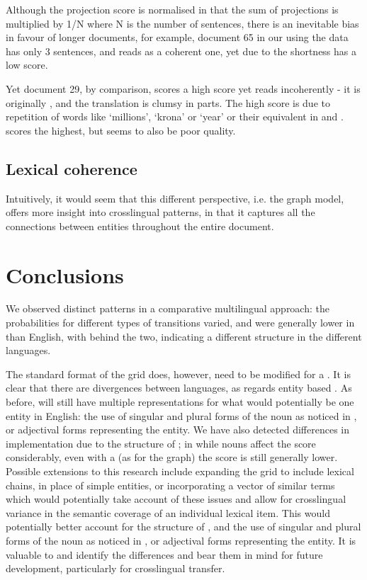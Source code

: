 \documentclass[output=paper]{langsci/langscibook.cls}
\begin{document}
Although the projection score is normalised in that the sum of projections is multiplied by 1/N where N is the number of sentences, there is an inevitable bias in favour of longer documents, for example, document 65 in our  using the  data has only 3 sentences, and reads as a coherent one, yet due to the shortness has a low score.
 	
Yet document 29, by comparison, scores a high score yet reads incoherently - it is originally , and the translation is clumsy in parts. The high score is due to repetition of words like `millions', `krona' or `year' or their equivalent in  and .  scores the highest, but seems to also be poor quality.

\subsection{Lexical coherence}
Intuitively, it would seem that this different perspective, i.e. the graph model, offers more insight into crosslingual  patterns, in that it captures all the connections between entities throughout the entire document.

\section{Conclusions}\label{conclusions}
We observed distinct patterns in a comparative multilingual approach: the probabilities for different types of  transitions varied, and were generally lower in  than English, with  behind the two, indicating a different  structure in the different languages.  

The standard format of the grid does, however, need to be modified for a . It is clear that there are divergences between languages, as regards entity based . As before,  will still have multiple representations for what would potentially be one entity in English: the use of singular and plural forms of the noun as noticed in , or adjectival forms representing the entity. We have also detected differences in implementation due to the  structure of ; in  while  nouns affect the  score considerably, even with a  (as for the graph) the  score is still generally lower. 
Possible extensions to this research include expanding the grid to include lexical chains, in place of simple entities, or incorporating a vector of similar terms which would potentially take account of these issues and allow for crosslingual variance in the semantic coverage of an individual lexical item. This would potentially better account for the  structure of , and the use of singular and plural forms of the noun as noticed in , or adjectival forms representing the entity. 
It is valuable to  and identify the differences and bear them in mind for future development, particularly for crosslingual transfer. 
\end{document}

